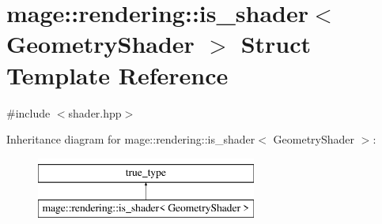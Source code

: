 \hypertarget{structmage_1_1rendering_1_1is__shader_3_01_geometry_shader_01_4}{}\section{mage\+:\+:rendering\+:\+:is\+\_\+shader$<$ Geometry\+Shader $>$ Struct Template Reference}
\label{structmage_1_1rendering_1_1is__shader_3_01_geometry_shader_01_4}


{\ttfamily \#include $<$shader.\+hpp$>$}

Inheritance diagram for mage\+:\+:rendering\+:\+:is\+\_\+shader$<$ Geometry\+Shader $>$\+:\begin{figure}[H]
\begin{center}
\leavevmode
\includegraphics[height=2.000000cm]{structmage_1_1rendering_1_1is__shader_3_01_geometry_shader_01_4}
\end{center}
\end{figure}
